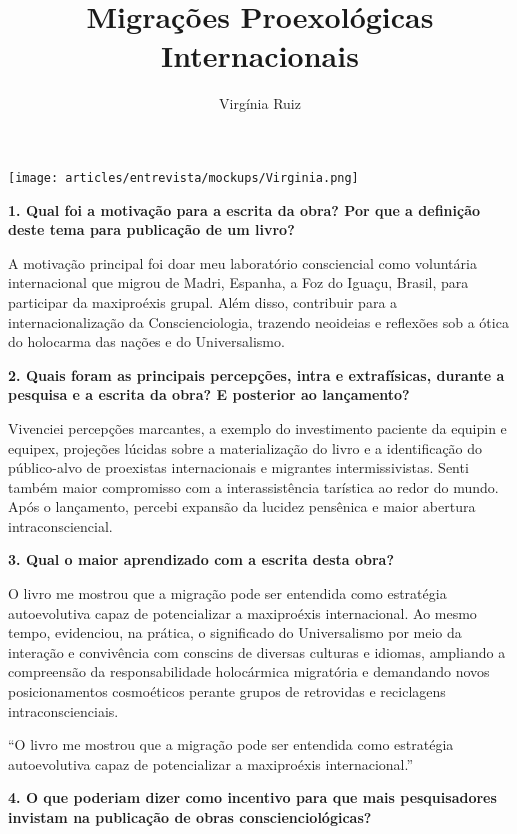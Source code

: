 \documentclass{gescons}
\author{Virgínia Ruiz}
\title{Migrações Proexológicas Internacionais}
\begin{document}
    \makeentrevistatitle

    \begin{multicols}{2}


\begin{center}
    \texttt{[image: articles/entrevista/mockups/Virginia.png]}
\end{center}


\textbf{1.       Qual foi a motivação para a escrita da obra? Por que a definição deste tema para publicação de um livro?}

A motivação principal foi doar meu laboratório consciencial como voluntária internacional que migrou de Madri, Espanha, a Foz do Iguaçu, Brasil, para participar da maxiproéxis grupal. Além disso, contribuir para a internacionalização da Conscienciologia, trazendo neoideias e reflexões sob a ótica do holocarma das nações e do Universalismo.


\textbf{2.       Quais foram as principais percepções, intra e extrafísicas, durante a pesquisa e a escrita da obra? E posterior ao lançamento?}

Vivenciei percepções marcantes, a exemplo do investimento paciente da equipin e equipex, projeções lúcidas sobre a materialização do livro e a identificação do público-alvo de proexistas internacionais e migrantes intermissivistas. Senti também maior compromisso com a interassistência tarística ao redor do mundo. Após o lançamento, percebi expansão da lucidez pensênica e maior abertura intraconsciencial.


\textbf{3.       Qual o maior aprendizado com a escrita desta obra?}

O livro me mostrou que a migração pode ser entendida como estratégia autoevolutiva capaz de potencializar a maxiproéxis internacional. Ao mesmo tempo, evidenciou, na prática, o significado do Universalismo por meio da interação e convivência com conscins de diversas culturas e idiomas, ampliando a compreensão da responsabilidade holocármica migratória e demandando novos posicionamentos cosmoéticos perante grupos de retrovidas e reciclagens intraconscienciais.

\begin{pullquote}
    ``O livro me mostrou que a migração pode ser entendida como estratégia autoevolutiva capaz de potencializar a maxiproéxis internacional.''
\end{pullquote}

\textbf{4.       O que poderiam dizer como incentivo para que mais pesquisadores invistam na publicação de obras conscienciológicas?}


\end{multicols}
\end{document}
